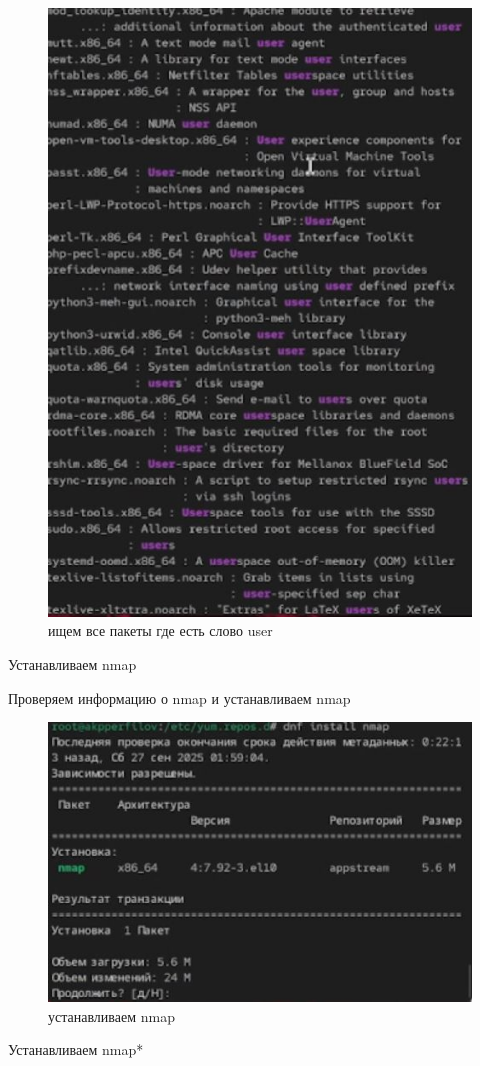 \documentclass[
  english,
  russian,
  12pt,
  a4paper,
  DIV=11,
  numbers=noendperiod]{scrreprt}
\begin{document}
\begin{figure}

{\centering \includegraphics[width=0.71\linewidth,height=\textheight,keepaspectratio]{image/6.jpg}

}

\caption{ищем все пакеты где есть слово user}

\end{figure}%

Устанавливаем nmap

Проверяем информацию о nmap и устанавливаем nmap

\begin{figure}

{\centering \includegraphics[width=0.3\linewidth,height=\textheight,keepaspectratio]{image/7.jpg}

}

\caption{устанавливаем nmap}

\end{figure}%

Устанавливаем nmap*
\end{document}
